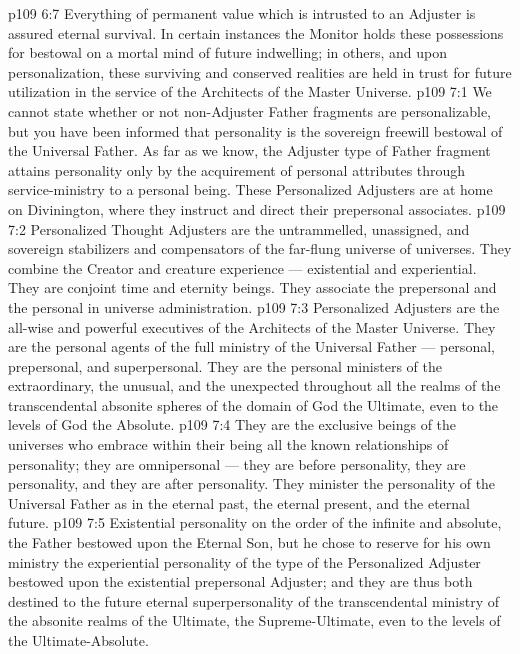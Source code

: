 \vs p109 6:7 Everything of permanent value which is intrusted to an Adjuster is assured eternal survival. In certain instances the Monitor holds these possessions for bestowal on a mortal mind of future indwelling; in others, and upon personalization, these surviving and conserved realities are held in trust for future utilization in the service of the Architects of the Master Universe.
\vs p109 7:1 We cannot state whether or not non\hyp{}Adjuster Father fragments are personalizable, but you have been informed that personality is the sovereign freewill bestowal of the Universal Father. As far as we know, the Adjuster type of Father fragment attains personality only by the acquirement of personal attributes through service\hyp{}ministry to a personal being. These Personalized Adjusters are at home on Divinington, where they instruct and direct their prepersonal associates.
\vs p109 7:2 Personalized Thought Adjusters are the untrammelled, unassigned, and sovereign stabilizers and compensators of the far\hyp{}flung universe of universes. They combine the Creator and creature experience --- existential and experiential. They are conjoint time and eternity beings. They associate the prepersonal and the personal in universe administration.
\vs p109 7:3 Personalized Adjusters are the all\hyp{}wise and powerful executives of the Architects of the Master Universe. They are the personal agents of the full ministry of the Universal Father --- personal, prepersonal, and superpersonal. They are the personal ministers of the extraordinary, the unusual, and the unexpected throughout all the realms of the transcendental absonite spheres of the domain of God the Ultimate, even to the levels of God the Absolute.
\vs p109 7:4 They are the exclusive beings of the universes who embrace within their being all the known relationships of personality; they are omnipersonal --- they are before personality, they are personality, and they are after personality. They minister the personality of the Universal Father as in the eternal past, the eternal present, and the eternal future.
\vs p109 7:5 Existential personality on the order of the infinite and absolute, the Father bestowed upon the Eternal Son, but he chose to reserve for his own ministry the experiential personality of the type of the Personalized Adjuster bestowed upon the existential prepersonal Adjuster; and they are thus both destined to the future eternal superpersonality of the transcendental ministry of the absonite realms of the Ultimate, the Supreme\hyp{}Ultimate, even to the levels of the Ultimate\hyp{}Absolute.
